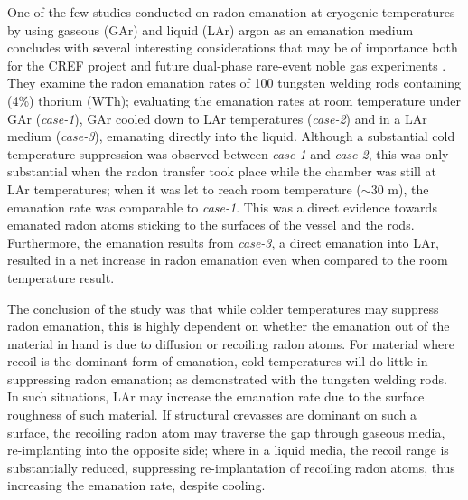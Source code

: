 One of the few studies conducted on radon emanation at cryogenic temperatures by using gaseous (GAr) and liquid (LAr) argon as an emanation medium concludes with several interesting considerations that may be of importance both for the CREF project and future dual-phase rare-event noble gas experiments \cite{cold_radon_measurements}. They examine the radon emanation rates of 100 tungsten welding rods containing (4\%) thorium (WTh); evaluating the emanation rates at room temperature under GAr (\textit{case-1}), GAr cooled down to LAr temperatures (\textit{case-2}) and in a LAr medium (\textit{case-3}), emanating directly into the liquid. Although a substantial cold temperature suppression was observed between \textit{case-1} and \textit{case-2}, this was only substantial when the radon transfer took place while the chamber was still at LAr temperatures; when it was let to reach room temperature ($\sim30$ m), the emanation rate was comparable to \textit{case-1}. This was a direct evidence towards emanated radon atoms sticking to the surfaces of the vessel and the rods. Furthermore, the emanation results from \textit{case-3}, a direct emanation into LAr, resulted in a net increase in radon emanation even when compared to the room temperature result. 

The conclusion of the study was that while colder temperatures may suppress radon emanation, this is highly dependent on whether the emanation out of the material in hand is due to diffusion or recoiling radon atoms. For material where recoil is the dominant form of emanation, cold temperatures will do little in suppressing radon emanation; as demonstrated with the tungsten welding rods. In such situations, LAr may increase the emanation rate due to the surface roughness of such material. If structural crevasses are dominant on such a surface, the recoiling radon atom may traverse the gap through gaseous media, re-implanting into the opposite side; where in a liquid media, the recoil range is substantially reduced, suppressing re-implantation of recoiling radon atoms, thus increasing the emanation rate, despite cooling. 

